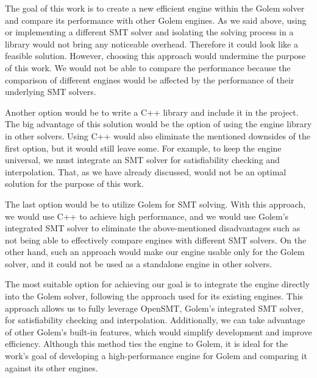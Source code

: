 The goal of this work is to create a new efficient engine within the Golem solver and compare its
performance with other Golem engines. As we said above, using or implementing a different SMT solver and isolating the solving process in a library would not
bring any noticeable overhead. Therefore it could look like a feasible
solution. However, choosing this approach would undermine the purpose of this work. We would not be able to compare the performance because the comparison
of different engines would be affected by the performance of their underlying
SMT solvers.

Another option would be to write a C++ library and include it in the project.
The big advantage of this solution would be the option of using the engine library
in other solvers. Using C++ would also eliminate the mentioned downsides of the
first option, but it would still leave some. For example, to keep the engine
universal, we must integrate an SMT solver for satisfiability checking
and interpolation. That, as we have already discussed, would not be an
optimal solution for the purpose of this work. 

The last option would be to utilize Golem for SMT solving. With this approach, we would use C++ to achieve high performance, and we would use Golem's integrated SMT solver to eliminate the above-mentioned disadvantages such as not being able to effectively compare engines with different SMT solvers. On the other hand, such an approach would make our engine usable only for the Golem solver, and it could not be used as a standalone engine in other solvers.

The most suitable option for achieving our goal is to integrate the engine directly into the Golem solver, following the approach used for its existing engines. This approach allows us to fully leverage OpenSMT, Golem’s integrated SMT solver, for satisfiability checking and interpolation. Additionally, we can take advantage of other Golem’s built-in features, which would simplify development and improve efficiency. Although this method ties the engine to Golem, it is ideal for the work's goal of developing a high-performance engine for Golem and comparing it against its other engines.

